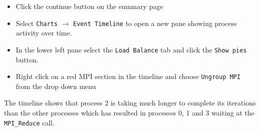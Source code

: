 \documentclass[a4paper,titlepage]{article}
\begin{document}
\begin{itemize}
\item Click the continue button on the summary page
\item Select \texttt{Charts} $\rightarrow$ \texttt{Event Timeline} to open a new pane showing process activity over time.
\item In the lower left pane select the \texttt{Load Balance} tab and click the \texttt{Show pies} button. 
\item Right click on a red MPI section in the timeline and choose \texttt{Ungroup MPI} from the drop down menu
\end{itemize}
The timeline shows that process 2 is taking much longer to complete its iterations than the other processes which has resulted in processes 0, 1 and 3 waiting at the \verb+MPI_Reduce+ call. \\
\end{document}
